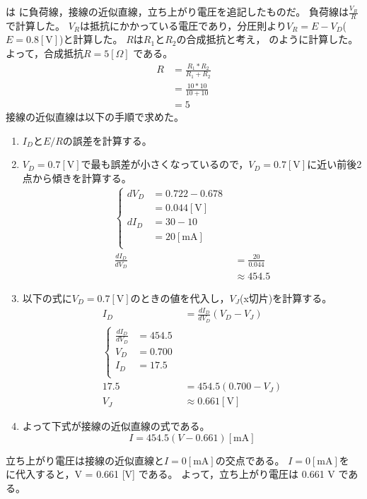    は に負荷線，接線の近似直線，立ち上がり電圧を追記したものだ。
  負荷線は$\frac{V_R}{R}$で計算した。
  $V_R$は抵抗にかかっている電圧であり，分圧則\cite{tyosho:denkiKiso1}より$V_R = E - V_D$($E=0.8\mathrm{[V]}$)と計算した。
  $R$は$R_1$と$R_2$の合成抵抗と考え， のように計算した。
  よって，合成抵抗$R=5[\Omega]$ である。
  \begin{align}
    R &= \frac{R_1*R_2}{R_1 + R_2} \nonumber \\
    &= \frac{10*10}{10 + 10} \nonumber \\
    &= 5 \label{eq:resistance_calc}
  \end{align}
  接線の近似直線は以下の手順で求めた。
  \begin{enumerate}
    \item $I_D$と$E/R$の誤差を計算する。
    \item $V_D = 0.7 \mathrm{[V]}$で最も誤差が小さくなっているので，$V_D = 0.7 \mathrm{[V]}$に近い前後2点から傾きを計算する。
        \begin{align}
          \begin{cases}
            dV_D &= 0.722 - 0.678 \nonumber \\
            &= 0.044 \mathrm{[V]} \nonumber \\
            dI_D &= 30 - 10 \nonumber \\
            &= 20 \mathrm{[mA]} \nonumber \\
          \end{cases} \nonumber \\
          \frac{dI_D}{dV_D} &= \frac{20}{0.044} \nonumber \\
          &\approx 454.5 \label{eq:approxLine_calc}
        \end{align}
    \item 以下の式に$V_D = 0.7 \mathrm{[V]}$のときの値を代入し，$V_J$(x切片)を計算する。
        \begin{align}
          I_D &= \frac{dI_D}{dV_D} (V_D - V_J) \nonumber \\
          \begin{cases}
            \frac{dI_D}{dV_D} &= 454.5 \nonumber \\
            V_D &= 0.700 \nonumber \\
            I_D &= 17.5 \nonumber \\
          \end{cases} \nonumber \\
          17.5 &= 454.5(0.700 - V_J) \nonumber \\
          V_J &\approx 0.661 \mathrm{[V]} \nonumber
        \end{align}
    \item よって下式が接線の近似直線の式である。
        \begin{equation}
          I = 454.5 (V - 0.661) \mathrm{[mA]} \label{eq:approxLine}
        \end{equation}
  \end{enumerate}
  立ち上がり電圧は接線の近似直線と$I = 0 \mathrm{[mA]}$の交点である。
  $I = 0 \mathrm{[mA]}$を に代入すると，V = 0.661 [V] である。
  よって，立ち上がり電圧は 0.661 V である。

